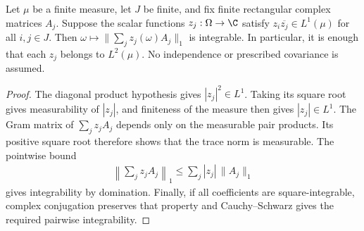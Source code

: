 \begin{theorem}
    \label{thm:physical_trace_matrix_integrability}
    \leanok
    Let $\mu$ be a finite measure, let $J$ be finite, and fix finite
    rectangular complex matrices $A_j$. Suppose the scalar functions
    $z_j:\Omega\to\C$ satisfy $z_i\overline{z_j}\in L^1(\mu)$ for all
    $i,j\in J$. Then
    $\omega\mapsto\|\sum_jz_j(\omega)A_j\|_1$ is integrable.
    In particular, it is enough that each $z_j$ belongs to $L^2(\mu)$.
    No independence or prescribed covariance is assumed.
\end{theorem}

\begin{proof}\leanok
    The diagonal product hypothesis gives $|z_j|^2\in L^1$.
    Taking its square root gives measurability of $|z_j|$, and finiteness
    of the measure then gives $|z_j|\in L^1$.
    The Gram matrix of $\sum_jz_jA_j$ depends only on the measurable pair
    products. Its positive square root therefore shows that the trace norm
    is measurable. The pointwise bound
    \begin{align}
        \left\|\sum_j z_jA_j\right\|_1\leq\sum_j|z_j|\,\|A_j\|_1
    \end{align}
    gives integrability by domination.
    Finally, if all coefficients are square-integrable, complex conjugation
    preserves that property and Cauchy--Schwarz gives the required pairwise
    integrability.
\end{proof}
